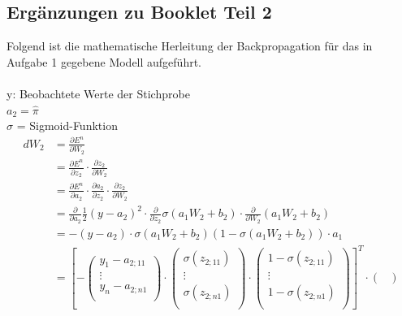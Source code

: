 \subsection{Ergänzungen zu Booklet Teil 2} \label{app:ergaenzung_booklet_2}
Folgend ist die mathematische Herleitung der Backpropagation für das in Aufgabe 1 gegebene Modell aufgeführt.\\\\
y: Beobachtete Werte der Stichprobe\\
$a_{2}=\hat{\pi}$\\
$\sigma$ = Sigmoid-Funktion
\begin{align*}
    dW_{2} &= \frac{\partial E^{n}}{\partial W_{2}}\\
    &= \frac{\partial E^{n}}{\partial z_{2}}\cdot \frac{\partial z_{2}}{\partial W_{2}}\\
    &= \frac{\partial E^{n}}{\partial a_{2}} \cdot \frac{\partial a_{2}}{\partial z_{2}} \cdot \frac{\partial z_{2}}{\partial W_{2}}\\
    &= \frac{\partial }{\partial a_{2}} \frac{1}{2}(y-a_{2})^{2} \cdot \frac{\partial }{\partial z_{2}} \sigma(a_{1}W_{2} + b_{2})\cdot \frac{\partial }{\partial W_{2}}(a_{1}W_{2}+b_{2})\\
    &= -(y-a_{2}) \cdot \sigma(a_{1}W_{2}+b_{2})(1-\sigma(a_{1}W_{2}+b_{2}))\cdot a_{1}\\
    &= \left[ -\begin{pmatrix}
        y_{1}  -  a_{2;11} \\
        \vdots \\
        y_{n}  -  a_{2;n1}  \\
        \end{pmatrix} \cdot \begin{pmatrix}
                            \sigma (z_{2;11}) \\
                            \vdots \\
                            \sigma (z_{2;n1})  \\
                            \end{pmatrix} \cdot \begin{pmatrix}
                                                    1-\sigma (z_{2;11}) \\
                                                    \vdots \\
                                                    1-\sigma (z_{2;n1})  \\
                                                    \end{pmatrix}\right]^{T} \cdot \begin{pmatrix}

\end{pmatrix}
\end{align*}
